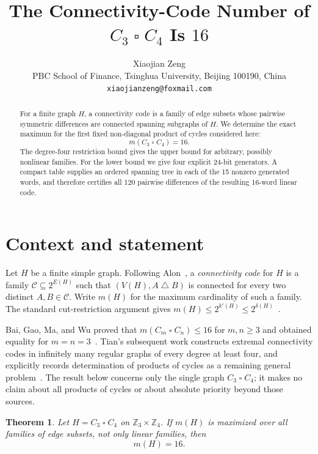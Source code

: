 \documentclass[11pt]{article}
\title{The Connectivity-Code Number of $C_3\mathbin{\square}C_4$ Is $16$}
\author{Xiaojian Zeng\\
  \small PBC School of Finance, Tsinghua University, Beijing 100190, China\\
  \small \texttt{xiaojianzeng@foxmail.com}}
\date{}
\newtheorem{theorem}{Theorem}
\newcommand{\cC}{\mathcal C}
\begin{document}
\maketitle

\begin{abstract}
For a finite graph $H$, a connectivity code is a family of edge subsets
whose pairwise symmetric differences are connected spanning subgraphs of
$H$.  We determine the exact maximum for the first fixed non-diagonal
product of cycles considered here:
\[
  m(C_3\mathbin{\square}C_4)=16.
\]
The degree-four restriction bound gives the upper bound for arbitrary,
possibly nonlinear families.  For the lower bound we give four explicit
24-bit generators.  A compact table supplies an ordered spanning tree in
each of the 15 nonzero generated words, and therefore certifies all 120
pairwise differences of the resulting 16-word linear code.
\end{abstract}

\section{Context and statement}

Let $H$ be a finite simple graph.  Following Alon~\cite{Alon2024}, a
\emph{connectivity code} for $H$ is a family $\cC\subseteq 2^{E(H)}$ such
that $(V(H),A\mathbin{\triangle}B)$ is connected for every two distinct
$A,B\in\cC$.  Write $m(H)$ for the maximum cardinality of such a family.
The standard cut-restriction argument gives
$m(H)\leq 2^{k'(H)}\leq 2^{\delta(H)}$~\cite{Alon2024}.

Bai, Gao, Ma, and Wu proved that
$m(C_m\mathbin{\square}C_n)\leq 16$ for $m,n\geq3$ and obtained equality
for $m=n=3$~\cite[Proposition~1.7]{BaiEtAl2024}.  Tian's subsequent work
constructs extremal connectivity codes in infinitely many regular graphs
of every degree at least four, and explicitly records determination of
products of cycles as a remaining general problem~\cite[Section~6(d)]{Tian2026}.
The result below concerns only the single graph $C_3\mathbin{\square}C_4$;
it makes no claim about all products of cycles or about absolute priority
beyond those sources.

\begin{theorem}\label{thm:main}
Let $H=C_3\mathbin{\square}C_4$ on
$\mathbb Z_3\times\mathbb Z_4$.  If $m(H)$ is maximized over all families
of edge subsets, not only linear families, then
\[
  m(H)=16.
\]
\end{theorem}
\end{document}
